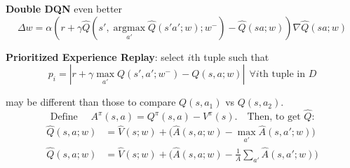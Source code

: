 \documentclass[10pt,landscape]{article}
\begin{document}
\begin{multicols}{3}
\textbf{Double DQN} even better
$$\Delta w=\alpha(r+\gamma \hat{Q}(s',\mathop{\arg\max}\limits_{a'}\hat{Q}(s'a';w);w^-)-\hat{Q}(sa;w))\nabla \hat{Q}(sa;w)$$

\textbf{Prioritized Experience Replay}: select $i$th tuple such that 
$$p_i=|
r+\gamma\max_{a'}Q(s',a';w^-)-Q(s,a;w)
|
\ \ \text{$\forall i$th tuple in $D$}$$

\vspace{1mm}

 may be
different than those to compare $Q(s,a_1)$ vs $Q(s,a_2)$.	
$$\text{Define }\quad 
A^\pi(s,a)=
Q^\pi(s,a)-
V^\pi(s). \quad \text{Then, to get $\hat{Q}$:}
$$
\begin{align*}
\hat{Q}(s,a;w)&=\hat{V}(s;w)+\Big(\hat{A}(s,a;w)-\max\limits_{a'}\hat{A}(s,a';w)\Big)
\\[-2mm]
\hat{Q}(s,a;w)&=\hat{V}(s;w)+\Big(\hat{A}(s,a;w)-\frac{1}{A}\sum_{a'}\hat{A}(s,a';w)\Big)
\end{align*}



\end{multicols}
\end{document}
